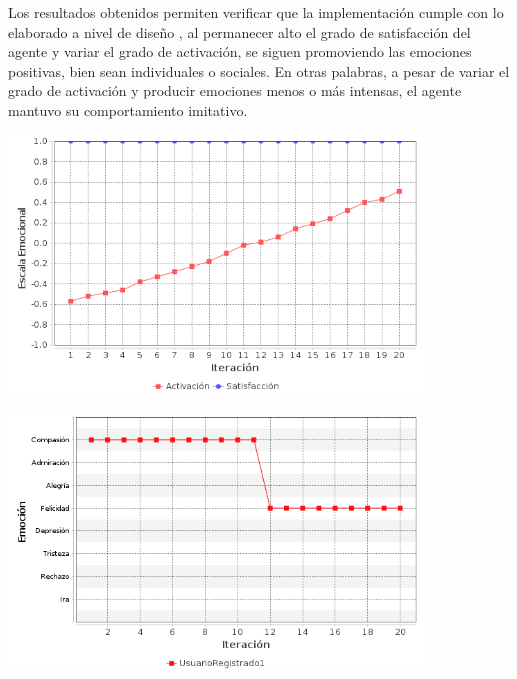Los resultados obtenidos permiten verificar que
la implementación cumple con lo elaborado a nivel de diseño \citep{perozo2012}, al permanecer alto el grado de satisfacción del
agente y variar el grado de activación, se siguen promoviendo las emociones positivas,
bien sean individuales o sociales. En
otras palabras, a pesar de variar el grado de activación y producir emociones menos o
más intensas, el agente mantuvo su comportamiento imitativo.

\begin{ilustracion}[fuente=\yo, etiqueta=emociones-individuales-escenerio1-estado-emocional-colaborador1, titulo={Variación del Estado Emocional del Agente, Caso de Estudio 2 Escenario 1}]
\includegraphics[width=11cm]{ilustraciones/resultados/caso2escenerio1-estado-emocional-colaborador1.png}
\end{ilustracion}

\begin{ilustracion}[fuente=\yo, etiqueta=emociones-individuales-escenario1-modificacion-de-emociones, titulo={Variación de la Emoción Exhibida por el Agente, Caso de Estudio 2 Escenario 1}]
\includegraphics[width=11cm]{ilustraciones/resultados/caso2escenerio1-modificacion-de-emociones.png}
\end{ilustracion}

